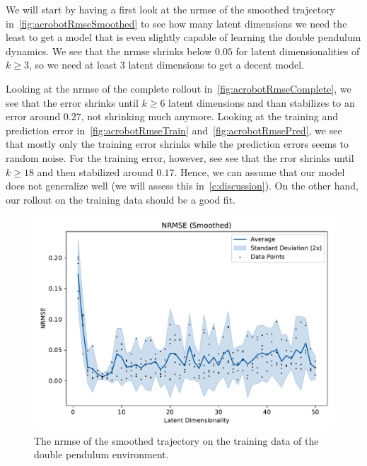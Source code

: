 			We will start by having a first look at the \ac{nrmse} of the smoothed trajectory in~\autoref{fig:acrobotRmseSmoothed} to see how many latent dimensions we need the least to get a model that is even slightly capable of learning the double pendulum dynamics. We see that the \ac{nrmse} shrinks below \(0.05\) for latent dimensionalities of \( k \geq 3 \), so we need at least \(3\) latent dimensions to get a decent model.

			Looking at the \ac{nrmse} of the complete rollout in~\autoref{fig:acrobotRmseComplete}, we see that the error shrinks until \( k \geq 6 \) latent dimensions and than stabilizes to an error around \( 0.27 \), not shrinking much anymore. Looking at the training and prediction error in~\autoref{fig:acrobotRmseTrain} and~\autoref{fig:acrobotRmsePred}, we see that mostly only the training error shrinks while the prediction errors seems to random noise. For the training error, however, see see that the rror shrinks until \( k \geq 18 \) and then stabilized around \( 0.17 \). Hence, we can assume that our model does not generalize well (we will assess this in~\autoref{c:discussion}). On the other hand, our rollout on the training data should be a good fit.

			\begin{figure}
				\centering
				\includegraphics[width=0.7\linewidth]{figures/results/acrobot-gym/latent-dim/comparison-rmse-smoothed-normalized-mean-vs-latent-dim.pdf}
				\caption{The \ac{nrmse} of the smoothed trajectory on the training data of the double pendulum environment.}
				\label{fig:acrobotRmseSmoothed}
			\end{figure}

